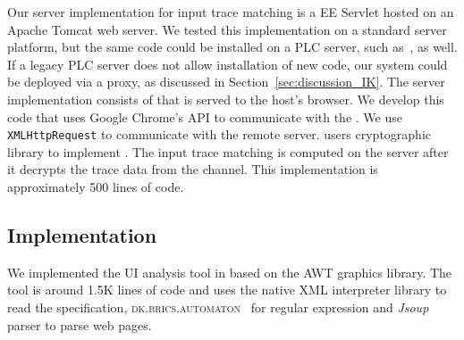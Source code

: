 Our server implementation for input trace matching is a \java EE Servlet hosted on an Apache Tomcat web server. We tested this implementation on a standard server platform, but the same code could be installed on a PLC server, such as~\cite{controlbyweb,siemens,siemens2,schneider}, as well. If a legacy PLC server does not allow installation of new code, our system could be deployed via a proxy, as discussed in Section~\ref{sec:discussion_IK}. The server implementation consists of \js that is served to the host's browser. We develop this \js code that uses Google Chrome's \webusb API to communicate with the \device. We use \texttt{XMLHttpRequest} to communicate with the remote server. \server users \java cryptographic library to implement \tls. The input trace matching is computed on the server after it decrypts the trace data from the \tls channel. This implementation is approximately 500 lines of code.


\subsection{\tool Implementation} 

We implemented the UI analysis tool in \java based on the \java AWT graphics library. The tool is around 1.5K lines of code and uses the \java native XML interpreter library to read the specification, \textsc{dk.brics.automaton}~\cite{brics} for regular expression and \emph{Jsoup} \html parser to parse web pages. 



